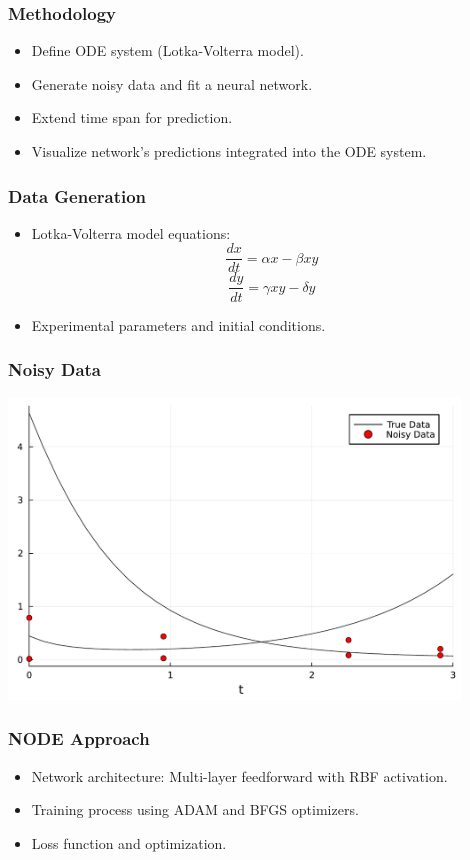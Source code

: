 \documentclass[aspectratio=169]{beamer}
\begin{document}
\begin{frame}
  \frametitle{Methodology }
  \begin{itemize}
    \item Define ODE system (Lotka-Volterra model).
    \item Generate noisy data and fit a neural network.
    \item Extend time span for prediction.
    \item Visualize network’s predictions integrated into the ODE system.
  \end{itemize}
\end{frame}

\begin{frame}
  \frametitle{Data Generation}
  \begin{itemize}
    \item Lotka-Volterra model equations:
    \[
    \frac{dx}{dt} = \alpha x - \beta xy
    \]
    \[
    \frac{dy}{dt} = \gamma xy - \delta y
    \]
    \item Experimental parameters and initial conditions.
  \end{itemize}
\end{frame}

\begin{frame}
  \frametitle{Noisy Data}
  \includegraphics[width=12cm]{plots/Chemostat_noisydata.pdf}
\end{frame}

\begin{frame}
  \frametitle{NODE Approach}
  \begin{itemize}
    \item Network architecture: Multi-layer feedforward with RBF activation.
    \item Training process using ADAM and BFGS optimizers.
    \item Loss function and optimization.
  \end{itemize}
\end{frame}
\end{document}

